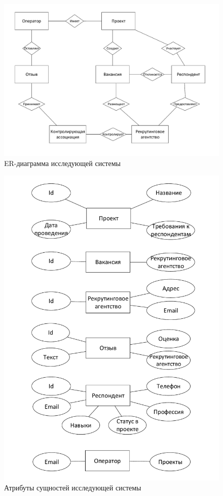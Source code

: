 \begin{figure}[ht]
  \centering
  \includegraphics[width=\textwidth]{include/er-survey.pdf}
\caption{ER-диаграмма исследующей системы}
\label{fig:er-survey}
\end{figure}

\begin{figure}[ht]
  \centering
  \includegraphics[width=\textwidth]{include/er-survey-at.pdf}
\caption{Атрибуты сущностей исследующей системы}
\label{fig:er-survey-at}
\end{figure}

